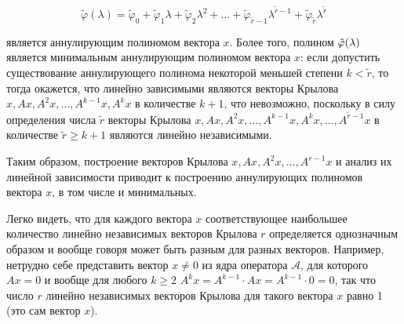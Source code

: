 $$ \tilde \varphi ( \lambda ) =
	\tilde \varphi_0  + \tilde \varphi_1 \lambda + \tilde \varphi_2 \lambda^2 + \dots
		+ \tilde \varphi_{\tilde r - 1} \lambda^{\tilde r - 1}
		+ \tilde \varphi_{\tilde r} \lambda^{\tilde r} $$

является аннулирующим полиномом вектора $x$. Более того, полином $\tilde \varphi (\lambda)$ является минимальным аннулирующим полиномом
вектора $x$: если допустить существование аннулирующего полинома некоторой меньшей степени $k < \tilde r$, то тогда окажется, что линейно
зависимыми являются векторы Крылова $x, Ax, A^2x, \dots, A^{k-1}x, A^kx$ в количестве $k+1$, что невозможно, поскольку в силу определения
числа $\tilde r$ векторы Крылова $x, Ax, A^2x, \dots, A^{k-1}x, A^kx, \dots, A^{\tilde r-1}x$ в количестве $\tilde r \ge k+1$ являются
линейно независимыми.

Таким образом, построение векторов Крылова $x, Ax, A^2x, \dots, A^{r-1}x$ и анализ их линейной зависимости приводит к построению
аннулирующих полиномов вектора $x$, в том числе и минимальных.

Легко видеть, что для каждого вектора $x$ соответствующее наибольшее количество линейно независимых векторов Крылова $r$ определяется
однозначным образом и вообще говоря может быть разным для разных векторов. Например, нетрудно себе представить вектор $x \neq 0$
из ядра оператора $\mathcal A$, для которого $Ax = 0$ и вообще для любого $k \ge 2$ $A^kx = A^{k-1} \cdot Ax = A^{k-1} \cdot 0 = 0$,
так что число $r$ линейно независимых векторов Крылова для такого вектора $x$ равно 1 (это сам вектор $x$).
